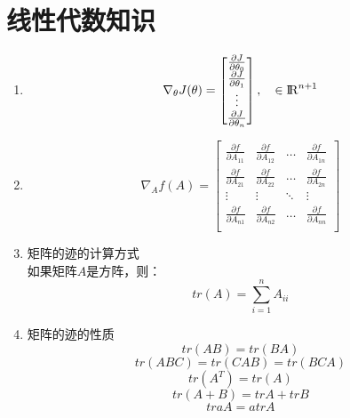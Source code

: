 \section{线性代数知识}
\begin{enumerate}
	\item
	\begin{equation}
		\nabla_{\theta}J(\theta) = \left[\begin{matrix}
		\frac{\partial J}{\partial\theta_0} \\
		\frac{\partial J}{\partial\theta_1} \\
		\vdots \\
		\frac{\partial J}{\partial\theta_n} \\
		\end{matrix}\right], \quad \in {\rm I\!R}^{n+1}
	\end{equation}

	\item
	\begin{equation}
		\nabla_Af(A) = \left[ \begin{matrix}
			\frac{\partial f}{\partial A_{11}} & \frac{\partial f}{\partial A_{12}} & \dots & \frac{\partial f}{\partial A_{1n}} \\
			\frac{\partial f}{\partial A_{21}} & \frac{\partial f}{\partial A_{22}} & \dots & \frac{\partial f}{\partial A_{2n}} \\
			\vdots & \vdots & \ddots & \vdots \\
			\frac{\partial f}{\partial A_{n1}} & \frac{\partial f}{\partial A_{n2}}& \dots & \frac{\partial f}{\partial A_{nn}} \\
		\end{matrix}\right]
	\end{equation}

	\item 矩阵的迹的计算方式 \\
	如果矩阵$A$是方阵，则：
	\begin{equation}
		tr(A) = \sum_{i=1}^nA_{ii}
	\end{equation}

	\item 矩阵的迹的性质
	\begin{equation}
		tr(AB) = tr(BA)
	\end{equation}
	\begin{equation}
		tr(ABC) = tr(CAB) = tr(BCA)
	\end{equation}
	\begin{equation}
		tr(A^T) = tr(A)
	\end{equation}
	\begin{equation}
		tr(A+B) = trA + trB
	\end{equation}
	\begin{equation}
		traA = atrA
	\end{equation}


\end{enumerate}
